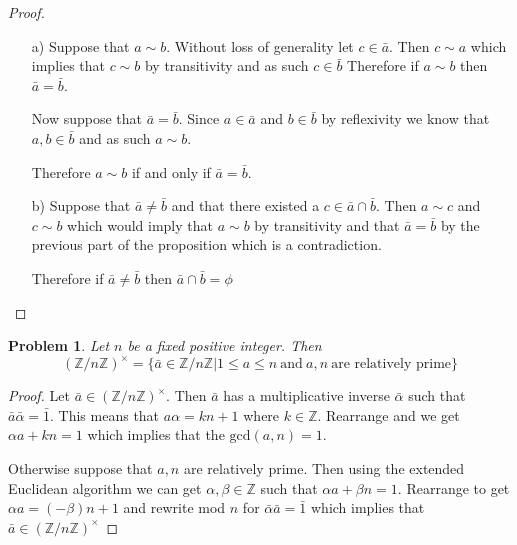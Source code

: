 \documentclass[10pt]{article}
\newcommand{\sk}{\vskip 10mm}
\newcommand{\bb}[1]{\mathbb{#1}}
\theoremstyle{plain}
\newtheorem{problem}{Problem}
\theoremstyle{remark}
\begin{document}
\begin{proof}\ \\
  \begin{itemize}
  \item[a)] Suppose that $a\sim b$. Without loss of generality let $c\in\bar{a}$. Then
    $c\sim a$ which implies that $c\sim b$ by transitivity and as such $c\in\bar{b}$
    Therefore if $a\sim b$ then $\bar{a}=\bar{b}$.

    Now suppose that $\bar{a}=\bar{b}$. Since $a\in\bar{a}$ and $b\in\bar{b}$ by
    reflexivity we know that $a,b\in\bar{b}$ and as such $a\sim b$.

    Therefore $a\sim b$ if and only if $\bar{a}=\bar{b}$.
  \item[b)] Suppose that $\bar{a}\neq\bar{b}$ and that there existed a
    $c\in \bar{a}\cap\bar{b}$. Then $a\sim c$ and $c\sim b$ which would imply that
    $a\sim b$ by transitivity and that $\bar{a}=\bar{b}$ by the previous part of the
    proposition which is a contradiction.

    Therefore if $\bar{a}\neq\bar{b}$ then $\bar{a}\cap\bar{b}=\phi$
  \end{itemize}
\end{proof}

\sk

\begin{problem}
  Let $n$ be a fixed positive integer. Then
  \[ (\bb{Z}/n\bb{Z})^\times = \{ \bar{a}\in \bb{Z}/n\bb{Z}|1\leq a\leq n\ \text{and}\ a,n\ \text{are relatively prime}\}\]
\end{problem}

\begin{proof}
  Let $\bar{a}\in(\bb{Z}/n\bb{Z})^\times$. Then $\bar{a}$ has a multiplicative inverse
  $\bar{\alpha}$ such that $\bar{a}\bar{\alpha}=\bar{1}$. This means that
  $a\alpha=kn+1$ where $k\in\bb{Z}$. Rearrange and we get
  $\alpha a+kn=1$ which implies that the $\mathrm{gcd}(a,n)=1$.

  Otherwise suppose that $a,n$ are relatively prime. Then using the extended
  Euclidean algorithm we can get $\alpha,\beta\in\bb{Z}$ such that $\alpha a+\beta n = 1$.
  Rearrange to get $\alpha a = (-\beta)n +1$ and rewrite mod $n$ for
  $\bar{\alpha}\bar{a}=\bar{1}$ which implies that $\bar{a}\in(\bb{Z}/n\bb{Z})^\times$
\end{proof}

\end{document}
